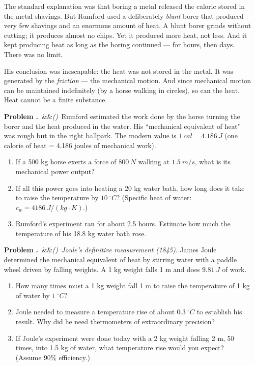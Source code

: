 \documentclass[12pt, a4paper, twoside]{book}
\newcounter{problem}[chapter]
\newcommand{\problem}[1][]{\refstepcounter{problem}\medskip\noindent
  \textcolor{accent}{\textbf{Problem \theproblem.}}\ \ifx&#1&\else\textit{(#1)}\ \fi}
\begin{document}
The standard explanation was that boring a metal released the caloric stored in the metal shavings. But Rumford used a deliberately \textit{blunt} borer that produced very few shavings and an enormous amount of heat. A blunt borer grinds without cutting; it produces almost no chips. Yet it produced more heat, not less. And it kept producing heat as long as the boring continued --- for hours, then days. There was no limit.

His conclusion was inescapable: the heat was not stored in the metal. It was generated by the \textit{friction} --- the mechanical motion. And since mechanical motion can be maintained indefinitely (by a horse walking in circles), so can the heat. Heat cannot be a finite substance.

\begin{explobox}
\problem Rumford estimated the work done by the horse turning the borer and the heat produced in the water. His ``mechanical equivalent of heat'' was rough but in the right ballpark. The modern value is $\SI{1}{cal} = \SI{4.186}{J}$ (one calorie of heat = 4.186 joules of mechanical work).
\begin{enumerate}[label=(\alph*)]
  \item If a 500 kg horse exerts a force of $\SI{800}{N}$ walking at $\SI{1.5}{m/s}$, what is its mechanical power output?
  \item If all this power goes into heating a 20 kg water bath, how long does it take to raise the temperature by $\SI{10}{^\circ C}$? (Specific heat of water: $c_w = \SI{4186}{J/(kg\cdot K)}$.)
  \item Rumford's experiment ran for about 2.5 hours. Estimate how much the temperature of his 18.8 kg water bath rose.
\end{enumerate}

\problem \textit{Joule's definitive measurement (1845).} James Joule determined the mechanical equivalent of heat by stirring water with a paddle wheel driven by falling weights. A 1 kg weight falls 1 m and does $\SI{9.81}{J}$ of work.
\begin{enumerate}[label=(\alph*)]
  \item How many times must a 1 kg weight fall 1 m to raise the temperature of 1 kg of water by $\SI{1}{^\circ C}$?
  \item Joule needed to measure a temperature rise of about $\SI{0.3}{^\circ C}$ to establish his result. Why did he need thermometers of extraordinary precision?
  \item If Joule's experiment were done today with a 2 kg weight falling 2 m, 50 times, into 1.5 kg of water, what temperature rise would you expect? (Assume 90\% efficiency.)
\end{enumerate}


\end{explobox}
\end{document}
